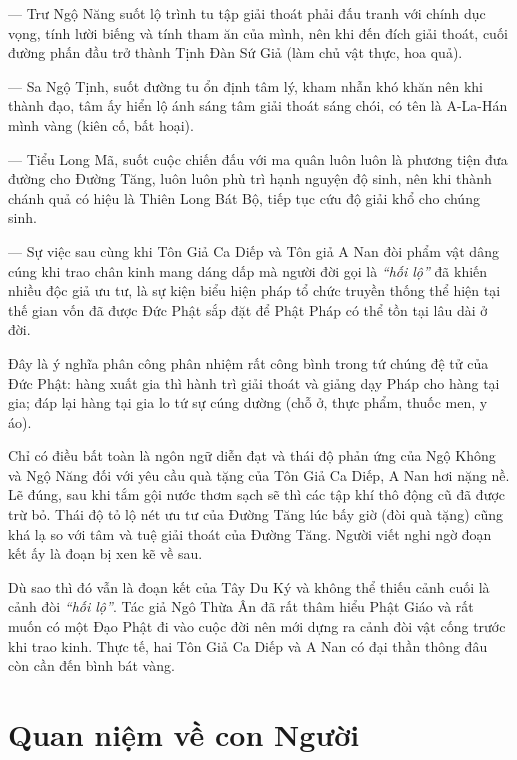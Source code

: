— Trư Ngộ Năng suốt lộ trình tu tập giải thoát phải đấu tranh với chính dục vọng, tính lười biếng và tính tham ăn của mình, nên khi đến đích giải thoát, cuối đường phấn đầu trở thành Tịnh Đàn Sứ Giả (làm chủ vật thực, hoa quả).

— Sa Ngộ Tịnh, suốt đường tu ổn định tâm lý, kham nhẫn khó khăn nên khi thành đạo, tâm ấy hiển lộ ánh sáng tâm giải thoát sáng chói, có tên là A-La-Hán mình vàng (kiên cố, bất hoại).

— Tiểu Long Mã, suốt cuộc chiến đấu với ma quân luôn luôn là phương tiện đưa đường cho Đường Tăng, luôn luôn phù trì hạnh nguyện độ sinh, nên khi thành chánh quả có hiệu là Thiên Long Bát Bộ, tiếp tục cứu độ giải khổ cho chúng sinh.

— Sự việc sau cùng khi Tôn Giả Ca Diếp và Tôn giả A Nan đòi phẩm vật dâng cúng khi trao chân kinh mang dáng dấp mà người đời gọi là \emph{``hối lộ''} đã khiến nhiều độc giả ưu tư, là sự kiện biểu hiện pháp tổ chức truyền thống thể hiện tại thế gian vốn đã được Đức Phật sắp đặt để Phật Pháp có thể tồn tại lâu dài ở đời.

Đây là ý nghĩa phân công phân nhiệm rất công bình trong tứ chúng đệ tử của Đức Phật: hàng xuất gia thì hành trì giải thoát và giảng dạy Pháp cho hàng tại gia; đáp lại hàng tại gia lo tứ sự cúng dường (chỗ ở, thực phẩm, thuốc men, y áo).

Chỉ có điều bất toàn là ngôn ngữ diễn đạt và thái độ phản ứng của Ngộ Không và Ngộ Năng đối với yêu cầu quà tặng của Tôn Giả Ca Diếp, A Nan hơi nặng nề. Lẽ đúng, sau khi tắm gội nước thơm sạch sẽ thì các tập khí thô động cũ đã được trừ bỏ. Thái độ tỏ lộ nét ưu tư của Đường Tăng lúc bấy giờ (đòi quà tặng) cũng khá lạ so với tâm và tuệ giải thoát của Đường Tăng. Người viết nghi ngờ đoạn kết ấy là đoạn bị xen kẽ về sau.

Dù sao thì đó vẫn là đoạn kết của Tây Du Ký và không thể thiếu cảnh cuối là cảnh đòi \emph{``hối lộ''}. Tác giả Ngô Thừa Ân đã rất thâm hiểu Phật Giáo và rất muốn có một Đạo Phật đi vào cuộc đời nên mới dựng ra cảnh đòi vật cống trước khi trao kinh. Thực tế, hai Tôn Giả Ca Diếp và A Nan có đại thần thông đâu còn cần đến bình bát vàng.

\section{Quan niệm về con Người} %
\label{sec:98_99_100_con_nguoi}

